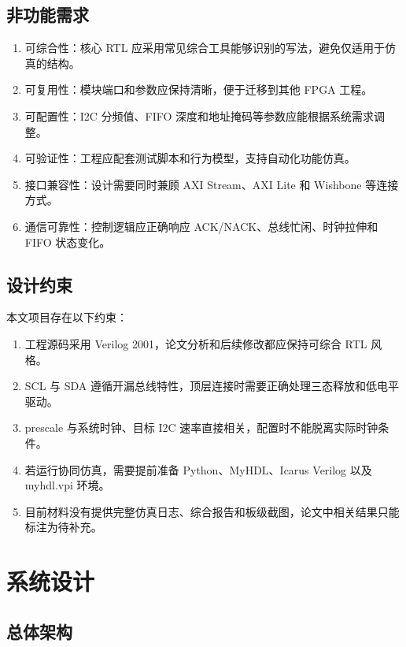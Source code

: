 \documentclass[12pt,a4paper]{article}
\numberwithin{equation}{section}
\providecommand{\tightlist}{%
  \setlength{\itemsep}{0pt}\setlength{\parskip}{0pt}}
\begin{document}
\subsection{非功能需求}\label{ux975eux529fux80fdux9700ux6c42}

\begin{enumerate}
\def\labelenumi{\arabic{enumi}.}
\tightlist
\item
  可综合性：核心 RTL
  应采用常见综合工具能够识别的写法，避免仅适用于仿真的结构。
\item
  可复用性：模块端口和参数应保持清晰，便于迁移到其他 FPGA 工程。
\item
  可配置性：I2C 分频值、FIFO 深度和地址掩码等参数应能根据系统需求调整。
\item
  可验证性：工程应配套测试脚本和行为模型，支持自动化功能仿真。
\item
  接口兼容性：设计需要同时兼顾 AXI Stream、AXI Lite 和 Wishbone
  等连接方式。
\item
  通信可靠性：控制逻辑应正确响应 ACK/NACK、总线忙闲、时钟拉伸和 FIFO
  状态变化。
\end{enumerate}

\subsection{设计约束}\label{ux8bbeux8ba1ux7ea6ux675f}

本文项目存在以下约束：

\begin{enumerate}
\def\labelenumi{\arabic{enumi}.}
\tightlist
\item
  工程源码采用 Verilog 2001，论文分析和后续修改都应保持可综合 RTL 风格。
\item
  SCL 与 SDA
  遵循开漏总线特性，顶层连接时需要正确处理三态释放和低电平驱动。
\item
  prescale 与系统时钟、目标 I2C
  速率直接相关，配置时不能脱离实际时钟条件。
\item
  若运行协同仿真，需要提前准备 Python、MyHDL、Icarus Verilog 以及
  myhdl.vpi 环境。
\item
  目前材料没有提供完整仿真日志、综合报告和板级截图，论文中相关结果只能标注为待补充。
\end{enumerate}

\section{系统设计}\label{ux7cfbux7edfux8bbeux8ba1}

\subsection{总体架构}\label{ux603bux4f53ux67b6ux6784}
\end{document}
